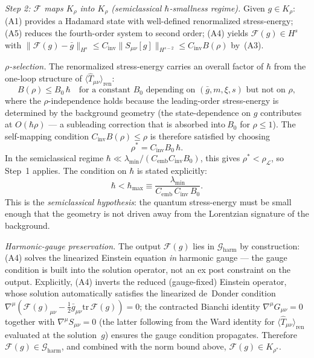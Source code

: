 \documentclass[12pt,a4paper]{article}
\begin{document}
\smallskip\noindent\textit{Step 2: $\mathcal{F}$ maps $K_\rho$ into $K_\rho$
(semiclassical $\hbar$-smallness regime).}
Given $g \in K_\rho$: (A1) provides a Hadamard state with well-defined renormalized
stress-energy; (A5) reduces the fourth-order system to second order; (A4) yields
$\mathcal{F}(g) \in H^s$ with
$\|\mathcal{F}(g) - \bar{g}\|_{H^s} \leq C_{\text{inv}}\|S_{\mu\nu}[g]\|_{H^{s-2}}
\leq C_{\text{inv}}B(\rho)$
by~(A3).

\emph{$\rho$-selection.} The renormalized stress-energy carries an overall factor of
$\hbar$ from the one-loop structure of $\langle\hat{T}_{\mu\nu}\rangle_{\text{ren}}$:
\begin{equation}
B(\rho) \leq B_0\,\hbar \quad \text{for a constant } B_0 \text{ depending on }
(\bar{g}, m, \xi, s) \text{ but not on } \rho,
\label{eq:B_hbar}
\end{equation}
where the $\rho$-independence holds because the leading-order stress-energy is
determined by the background geometry (the state-dependence on $g$ contributes at
$O(\hbar\rho)$ — a subleading correction that is absorbed into$~B_0$ for
$\rho \leq 1$). The self-mapping condition $C_{\text{inv}}B(\rho) \leq \rho$ is therefore
satisfied by choosing
\begin{equation}
\rho^* = C_{\text{inv}}B_0\,\hbar.
\label{eq:rho_star}
\end{equation}
In the semiclassical regime $\hbar \ll \lambda_{\min}/(C_{\mathrm{emb}}C_{\text{inv}}B_0)$,
this gives $\rho^* < \rho_{\mathcal{L}}$, so Step~1 applies.
The condition on $\hbar$ is stated explicitly:
\begin{equation}
\hbar < \hbar_{\max} \equiv \frac{\lambda_{\min}}{C_{\mathrm{emb}}\,C_{\text{inv}}\,B_0}.
\label{eq:hbar_max}
\end{equation}
This is the \emph{semiclassical hypothesis}: the quantum stress-energy must be small
enough that the geometry is not driven away from the Lorentzian signature of the
background.

\emph{Harmonic-gauge preservation.} The output $\mathcal{F}(g)$ lies in
$\mathcal{G}_{\text{harm}}$ by construction: (A4) solves the linearized Einstein equation
\emph{in} harmonic gauge — the gauge condition is built into the solution operator, not
an ex post constraint on the output. Explicitly, (A4) inverts the reduced (gauge-fixed)
Einstein operator, whose solution automatically satisfies the linearized de~Donder
condition $\nabla^\mu(\mathcal{F}(g)_{\mu\nu} -
\tfrac{1}{2}\bar{g}_{\mu\nu}\mathrm{tr}\,\mathcal{F}(g)) = 0$; the contracted Bianchi
identity $\nabla^\mu G_{\mu\nu} = 0$ together with $\nabla^\mu S_{\mu\nu} = 0$ (the
latter following from the Ward identity for $\langle\hat{T}_{\mu\nu}\rangle_{\text{ren}}$
evaluated at the solution~$g$) ensures the gauge condition propagates. Therefore
$\mathcal{F}(g) \in \mathcal{G}_{\text{harm}}$, and combined with the norm bound above,
$\mathcal{F}(g) \in K_{\rho^*}$.
\end{document}
